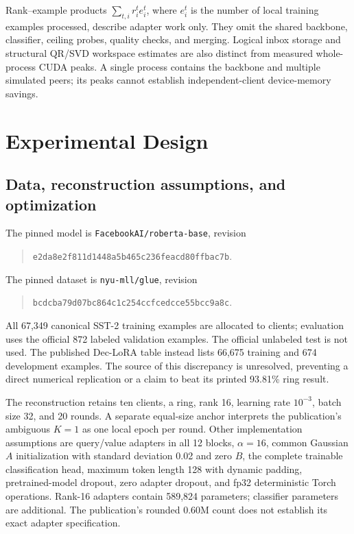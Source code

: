 \documentclass[11pt]{article}
\begin{document}
Rank--example products $\sum_{t,i}r_i^t e_i^t$, where $e_i^t$ is the number of local training examples processed, describe adapter work only. They omit the shared backbone, classifier, ceiling probes, quality checks, and merging. Logical inbox storage and structural QR/SVD workspace estimates are also distinct from measured whole-process CUDA peaks. A single process contains the backbone and multiple simulated peers; its peaks cannot establish independent-client device-memory savings.

\section{Experimental Design}
\subsection{Data, reconstruction assumptions, and optimization}
The pinned model is \texttt{FacebookAI/roberta-base}, revision
\begin{quote}\small\texttt{e2da8e2f811d1448a5b465c236feacd80ffbac7b}.\end{quote}
The pinned dataset is \texttt{nyu-mll/glue}, revision
\begin{quote}\small\texttt{bcdcba79d07bc864c1c254ccfcedcce55bcc9a8c}.\end{quote}
All 67,349 canonical SST-2 training examples are allocated to clients; evaluation uses the official 872 labeled validation examples. The official unlabeled test is not used. The published Dec-LoRA table instead lists 66,675 training and 674 development examples. The source of this discrepancy is unresolved, preventing a direct numerical replication or a claim to beat its printed 93.81\% ring result.

The reconstruction retains ten clients, a ring, rank 16, learning rate $10^{-3}$, batch size 32, and 20 rounds. A separate equal-size anchor interprets the publication's ambiguous $K=1$ as one local epoch per round. Other implementation assumptions are query/value adapters in all 12 blocks, $\alpha=16$, common Gaussian $A$ initialization with standard deviation 0.02 and zero $B$, the complete trainable classification head, maximum token length 128 with dynamic padding, pretrained-model dropout, zero adapter dropout, and fp32 deterministic Torch operations. Rank-16 adapters contain 589,824 parameters; classifier parameters are additional. The publication's rounded 0.60M count does not establish its exact adapter specification.
\end{document}
